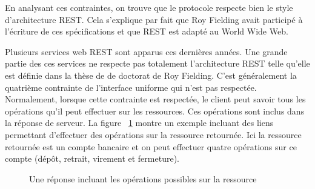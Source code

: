 En analysant ces contraintes, on trouve que le protocole  respecte bien le style d'architecture REST. Cela s'explique par fait que Roy Fielding avait participé à l'écriture de ces spécifications et que REST est adapté au World Wide Web.  

Plusieurs services web REST sont apparus ces dernières années. Une grande partie des ces services ne respecte pas totalement l'architecture REST telle qu'elle est définie dans la thèse de de doctorat de Roy Fielding. C'est généralement la quatrième contrainte de l'interface uniforme qui n'est pas respectée. Normalement, lorsque cette contrainte est respectée, le client peut savoir tous les opérations qu'il peut effectuer sur les ressources. Ces opérations sont inclus dans la réponse de serveur. La figure ~\ref{fig:hateoas} montre un exemple incluant des liens permettant d'effectuer des opérations sur la ressource retournée. Ici la ressource retournée est un compte bancaire et on peut effectuer quatre opérations sur ce compte (dépôt, retrait, virement et fermeture). 


\begin{figure}[htp]
    \centering
    \caption{Une réponse incluant les opérations possibles sur la ressource}
    \label{fig:hateoas}
\end{figure}



